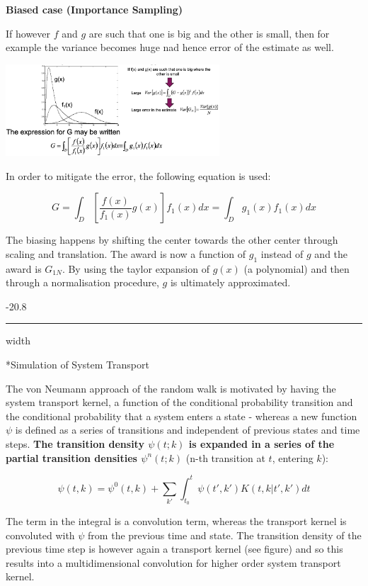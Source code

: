 \documentclass[8pt, landscape, fleqn]{scrartcl}
\makeatletter
\renewcommand{\subsubsection}{\@startsection{subsubsection}{1}{0mm}%
{-2\baselineskip}{0.8\baselineskip}%
{\hrule depth 0.2pt width\columnwidth\vspace*{1.2em}\normalsize\bfseries\rmfamily}}
\makeatother
\begin{document}
\begin{multicols*}{3}
\textbf{Biased case (Importance Sampling)}

If however $f$ and $g$ are such that one is big and the other is small, then for example the variance becomes huge nad hence error of the estimate as well. 

\includegraphics[width=8cm]{Images/BiasedSampling.png}

In order to mitigate the error, the following equation is used:

\begin{equation}
    G =  \int_D \left[ \frac{f(x)}{f_1(x)} g(x)\right] f_1(x) dx = \int_D g_1(x) f_1(x) dx
\end{equation}

The biasing happens by shifting the center towards the other center through scaling and translation. The award is now a function of $g_1$ instead of $g$ and the award is $G_{1N}$. By using the taylor expansion of $g(x)$ (a polynomial) and then through a normalisation procedure, $g$ is ultimately approximated.

\subsubsection*{Simulation of System Transport}

The von Neumann approach of the random walk is motivated by having the system transport kernel, a function of the conditional probability transition and the conditional probability that a system enters a state - whereas a new function $\psi$ is defined as a series of transitions and independent of previous states and time steps. \textbf{The transition density $\psi(t;k)$ is expanded in a series of the partial transition densities $\psi^n(t;k)$} (n-th transition at $t$, entering $k$):

\begin{equation}
    \psi(t,k) = \psi^0(t,k) + \sum_{k'} \int_{t_0}^t \psi(t',k')K(t,k | t',k') dt
\end{equation}

The term in the integral is a convolution term, whereas the transport kernel is convoluted with $\psi$ from the previous time and state. The transition density of the previous time step is however again a transport kernel (see figure) and so this results into a multidimensional convolution for higher order system transport kernel. 


\end{multicols*}
\end{document}
